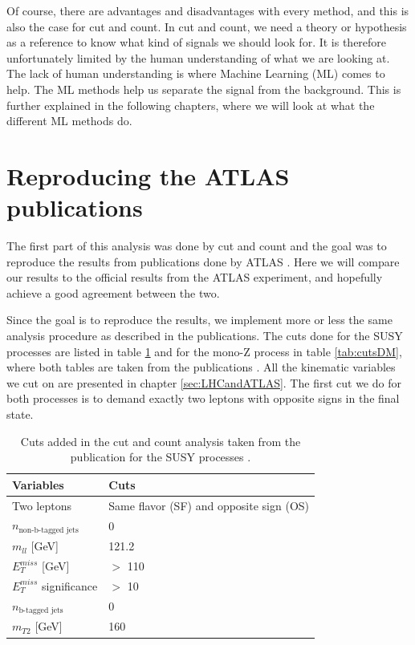 Of course, there are advantages and disadvantages with every method, and this is also the case for cut and count. In cut and count, we need a theory or hypothesis as a reference to know what kind of signals we should look for. It is therefore unfortunately limited by the human understanding of what we are looking at. The lack of human understanding is where Machine Learning (ML) comes to help. The ML methods help us separate the signal from the background. This is further explained in the following chapters, where we will look at what the different ML methods do.






\section{Reproducing the ATLAS publications}
The first part of this analysis was done by cut and count and the goal was to reproduce the results from publications done by ATLAS \cite{sleptonexclusion, monoZexclusion}. Here we will compare our results to the official results from the ATLAS experiment, and hopefully achieve a good agreement between the two.

Since the goal is to reproduce the results, we implement more or less the same analysis procedure as described in the publications. The cuts done for the SUSY processes are listed in table \ref{tab:cutsSUSY} and for the mono-Z process in table \ref{tab:cutsDM}, where both tables are taken from the publications \cite{sleptonexclusion, monoZexclusion}. All the kinematic variables we cut on are presented in chapter \ref{sec:LHCandATLAS}. The first cut we do for both processes is to demand exactly two leptons with opposite signs in the final state.


\begin{table}[H]
    \centering
    \begin{tabular}{l l}\toprule
    \textbf{Variables} & \textbf{Cuts}\\
    \midrule
    \midrule
    Two leptons & Same flavor (SF) and opposite sign (OS)\\
    $n_{\text{non-b-tagged jets}}$     & 0 \\
    $m_{ll}$ [GeV]     & 121.2\\
    $E_T^{miss}$ [GeV] & $>$ 110 \\
    $E_T^{miss}$ significance & $>$ 10\\
    $n_{\text{b-tagged jets}}$ & 0\\
    $m_{T2}$ [GeV] & 160\\
    \bottomrule
    \end{tabular}
    \caption{Cuts added in the cut and count analysis taken from the publication for the SUSY processes \cite{sleptonexclusion}.}
    \label{tab:cutsSUSY}
\end{table}

